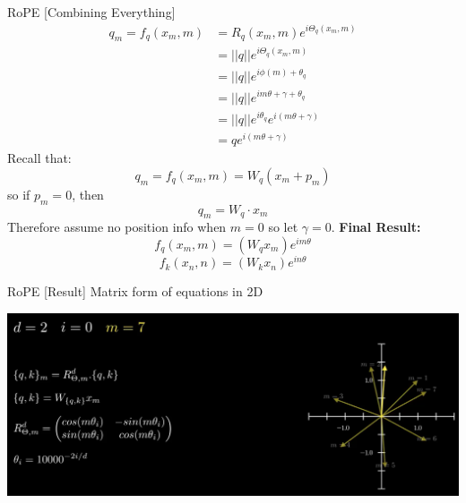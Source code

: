 \documentclass{beamer}
\begin{document}
\begin{frame}[t]{RoPE [Combining Everything]}
    \vspace{-2.5em}
    \begin{align}
        q_m = f_q(x_m, m) &= R_q(x_m, m) e^{i \Theta_q (x_m, m)}\\
                          &= ||q|| e^{i \Theta_q (x_m, m)}\\
                          &= ||q|| e^{i \phi(m) + \theta_q}\\
                          &= ||q|| e^{i m \theta + \gamma + \theta_q}\\
                          &= ||q|| e^{i \theta_q}e^{i (m \theta + \gamma)}\\
                          &= q e^{i (m \theta + \gamma)}
    \end{align}
    Recall that:
    \[q_m = f_q(x_m, m) = W_q(x_m + p_m)\]
    so if $p_m = 0$, then
    \[ q_m = W_q \cdot x_m\]
    Therefore assume no position info when $m=0$ so let $\gamma = 0$.\newline
    \textbf{Final Result:}
    \[ f_q(x_m, m) = (W_q x_m)e^{i m \theta}\]
    \[ f_k(x_n, n) = (W_k x_n)e^{i n \theta}\]

\end{frame}


\begin{frame}[t]{RoPE [Result]}
    Matrix form of equations in 2D
    \begin{center}
        \includegraphics[width=1.0\textwidth]{./img/rope_3.png}
    \end{center}
\end{frame}
\end{document}
